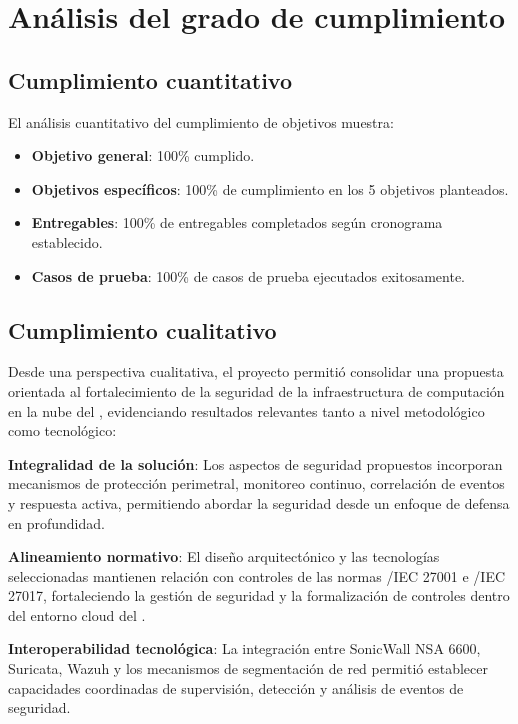 \section{Análisis del grado de cumplimiento}
\noindent

\subsection{Cumplimiento cuantitativo}
\noindent

El análisis cuantitativo del cumplimiento de objetivos muestra:

\begin{itemize}
    \item \textbf{Objetivo general}: 100\% cumplido.
    \item \textbf{Objetivos específicos}: 100\% de cumplimiento en los 5 objetivos planteados.
    \item \textbf{Entregables}: 100\% de entregables completados según cronograma establecido.
    \item \textbf{Casos de prueba}: 100\% de casos de prueba ejecutados exitosamente.
\end{itemize}

\subsection{Cumplimiento cualitativo}
\noindent

Desde una perspectiva cualitativa, el proyecto permitió consolidar una propuesta orientada al fortalecimiento de la seguridad de la 
infraestructura de computación en la nube del \GRID, evidenciando resultados relevantes tanto a nivel metodológico como tecnológico:

\textbf{Integralidad de la solución}: Los aspectos de seguridad propuestos incorporan mecanismos de protección perimetral, monitoreo 
continuo, correlación de eventos y respuesta activa, permitiendo abordar la seguridad desde un enfoque de defensa en profundidad.

\textbf{Alineamiento normativo}: El diseño arquitectónico y las tecnologías seleccionadas mantienen relación con controles de las normas 
\ISO/IEC 27001 e \ISO/IEC 27017, fortaleciendo la gestión de seguridad y la formalización de controles dentro del entorno cloud del \GRID.

\textbf{Interoperabilidad tecnológica}: La integración entre SonicWall NSA 6600, Suricata, Wazuh y los mecanismos de segmentación de red 
permitió establecer capacidades coordinadas de supervisión, detección y análisis de eventos de seguridad.

